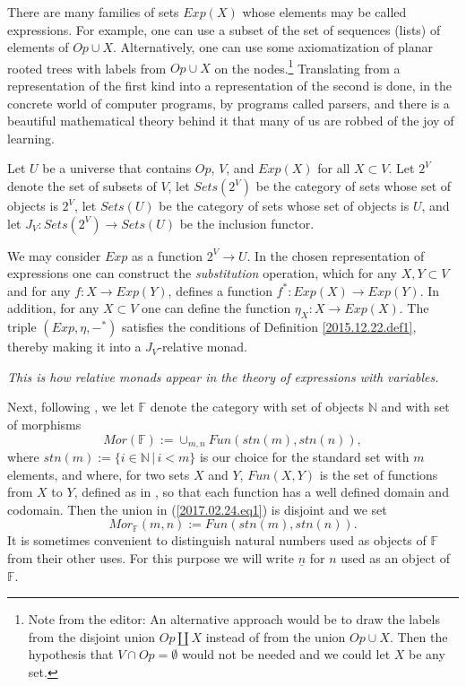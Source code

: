 \documentclass[12pt]{amsart}
\numberwithin{proposition}{subsection}
\newcommand{\llabel}[1]{\label{#1}}
\newcommand{\sr}{\rightarrow}
\newcommand{\nn}{{\mathbb N}}
\newcommand{\nat}{\nn}
\newcommand{\uu}{\underline}
\newcommand{\mbind}[1]{{#1^*}}
\newcommand{\FF}{{\mathbb F}}
\newcommand{\ff}[1]{\uu{#1}}
\newcommand{\editorfootnote}[1]{\footnote{Note from the editor: #1}}
\begin{document}
There are many families of sets $Exp(X)$ whose elements may be called
expressions. For example, one can use a subset of the set of sequences (lists)
of elements of $Op\cup X$. Alternatively, one can use some axiomatization of
planar rooted trees with labels from $Op\cup X$ on the nodes.\editorfootnote{
  An alternative approach would be to draw the labels from the disjoint union
  $Op \amalg X$ instead of from the union $Op\cup X$.  Then the hypothesis that
  $V\cap Op=\emptyset$ would not be needed and we could let $X$ be any set.}
Translating from a representation of the first kind into a representation of
the second is done, in the concrete world of computer programs, by programs
called parsers, and there is a beautiful mathematical theory behind it that
many of us are robbed of the joy of learning.

Let $U$ be a universe that contains $Op$, $V$, and $Exp(X)$ for all $X\subset V$.
Let $2^V$ denote the set of subsets of $V$,
let $Sets(2^V)$ be the category of sets whose set of objects is $2^V$, let
$Sets(U)$ be the category of sets whose set of objects is $U$, and let
$J_V:Sets(2^V)\sr Sets(U)$ be the inclusion functor.

We may consider $Exp$ as a function $2^V\sr U$. In the chosen representation of
expressions one can construct the {\em substitution} operation, which for any
$X,Y\subset V$ and for any $f:X\sr Exp(Y)$, defines a function $\mbind{f}:Exp(X)\sr Exp(Y)$.
In addition, for any $X\subset V$ one can define the function
$\eta_{X}:X\sr Exp(X)$. The triple $(Exp,\eta,\mbind{-})$ satisfies the
conditions of Definition \ref{2015.12.22.def1}, thereby making it into a $J_V$-relative
monad.

{\em This is how relative monads appear in the theory of expressions with variables.}

Next, following \cite{FPT}, we let $\FF$ denote the category with set of
objects $\nat$ and with set of morphisms
%
\begin{equation}
\llabel{2017.02.24.eq1}
Mor(\FF):=\cup_{m,n}Fun(stn(m),stn(n)),
\end{equation}%
%
where $stn(m):=\{i\in\nat\,|\,i<m\}$ is our choice for the standard set with $m$
elements, and where, for two sets $X$ and $Y$, $Fun(X,Y)$ is the set of functions
from $X$ to $Y$, defined as in \cite[p.~81]{Bourbaki.Sets}, so that each
function has a well defined domain and codomain. Then the union in
(\ref{2017.02.24.eq1}) is disjoint and we set
%
$$Mor_{\FF}(m,n):=Fun(stn(m),stn(n)).$$
%
It is sometimes convenient to distinguish natural numbers used as objects of
$\FF$ from their other uses. For this purpose we will write $\ff{n}$ for $n$
used as an object of $\FF$.
\end{document}
